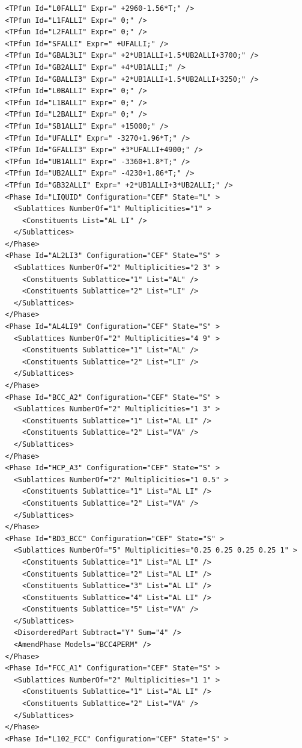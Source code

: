 \documentclass{article}
\begin{document}
\begin{appendices}
\begin{verbatim}
  <TPfun Id="L0FALLI" Expr=" +2960-1.56*T;" /> 
  <TPfun Id="L1FALLI" Expr=" 0;" /> 
  <TPfun Id="L2FALLI" Expr=" 0;" /> 
  <TPfun Id="SFALLI" Expr=" +UFALLI;" /> 
  <TPfun Id="GBAL3LI" Expr=" +2*UB1ALLI+1.5*UB2ALLI+3700;" /> 
  <TPfun Id="GB2ALLI" Expr=" +4*UB1ALLI;" /> 
  <TPfun Id="GBALLI3" Expr=" +2*UB1ALLI+1.5*UB2ALLI+3250;" /> 
  <TPfun Id="L0BALLI" Expr=" 0;" /> 
  <TPfun Id="L1BALLI" Expr=" 0;" /> 
  <TPfun Id="L2BALLI" Expr=" 0;" /> 
  <TPfun Id="SB1ALLI" Expr=" +15000;" /> 
  <TPfun Id="UFALLI" Expr=" -3270+1.96*T;" /> 
  <TPfun Id="GFALLI3" Expr=" +3*UFALLI+4900;" /> 
  <TPfun Id="UB1ALLI" Expr=" -3360+1.8*T;" /> 
  <TPfun Id="UB2ALLI" Expr=" -4230+1.86*T;" /> 
  <TPfun Id="GB32ALLI" Expr=" +2*UB1ALLI+3*UB2ALLI;" /> 
  <Phase Id="LIQUID" Configuration="CEF" State="L" >
    <Sublattices NumberOf="1" Multiplicities="1" >
      <Constituents List="AL LI" />
    </Sublattices>
  </Phase>
  <Phase Id="AL2LI3" Configuration="CEF" State="S" >
    <Sublattices NumberOf="2" Multiplicities="2 3" >
      <Constituents Sublattice="1" List="AL" />
      <Constituents Sublattice="2" List="LI" />
    </Sublattices>
  </Phase>
  <Phase Id="AL4LI9" Configuration="CEF" State="S" >
    <Sublattices NumberOf="2" Multiplicities="4 9" >
      <Constituents Sublattice="1" List="AL" />
      <Constituents Sublattice="2" List="LI" />
    </Sublattices>
  </Phase>
  <Phase Id="BCC_A2" Configuration="CEF" State="S" >
    <Sublattices NumberOf="2" Multiplicities="1 3" >
      <Constituents Sublattice="1" List="AL LI" />
      <Constituents Sublattice="2" List="VA" />
    </Sublattices>
  </Phase>
  <Phase Id="HCP_A3" Configuration="CEF" State="S" >
    <Sublattices NumberOf="2" Multiplicities="1 0.5" >
      <Constituents Sublattice="1" List="AL LI" />
      <Constituents Sublattice="2" List="VA" />
    </Sublattices>
  </Phase>
  <Phase Id="BD3_BCC" Configuration="CEF" State="S" >
    <Sublattices NumberOf="5" Multiplicities="0.25 0.25 0.25 0.25 1" >
      <Constituents Sublattice="1" List="AL LI" />
      <Constituents Sublattice="2" List="AL LI" />
      <Constituents Sublattice="3" List="AL LI" />
      <Constituents Sublattice="4" List="AL LI" />
      <Constituents Sublattice="5" List="VA" />
    </Sublattices>
    <DisorderedPart Subtract="Y" Sum="4" />
    <AmendPhase Models="BCC4PERM" />
  </Phase>
  <Phase Id="FCC_A1" Configuration="CEF" State="S" >
    <Sublattices NumberOf="2" Multiplicities="1 1" >
      <Constituents Sublattice="1" List="AL LI" />
      <Constituents Sublattice="2" List="VA" />
    </Sublattices>
  </Phase>
  <Phase Id="L102_FCC" Configuration="CEF" State="S" >

\end{verbatim}
\end{appendices}
\end{document}
